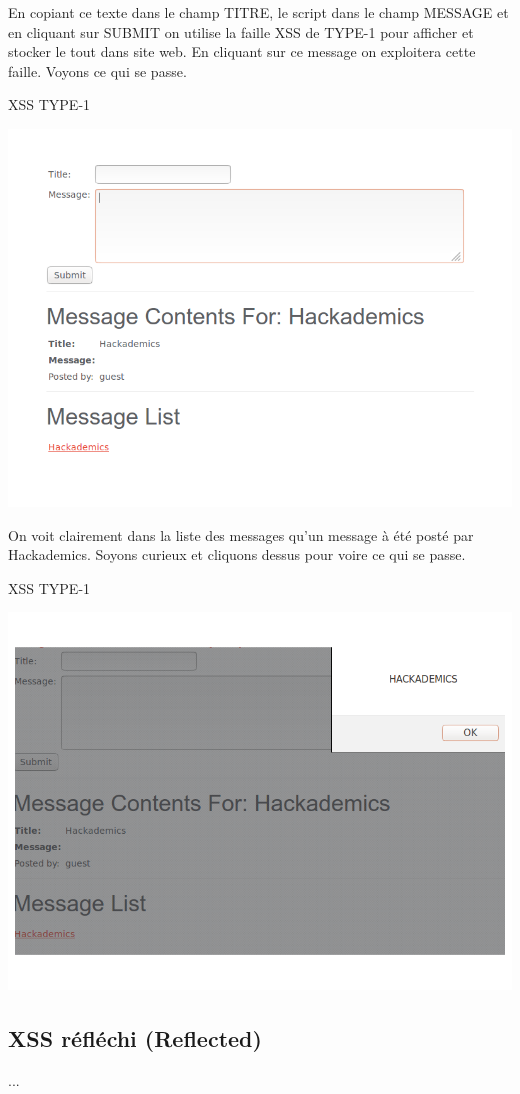 \begin{flushleft}
En copiant ce texte dans le champ TITRE, le script dans le champ MESSAGE et  en cliquant sur SUBMIT on utilise la faille XSS de TYPE-1 pour afficher et stocker le tout dans site web. En cliquant sur ce message on exploitera cette faille. Voyons ce qui se passe.
\end{flushleft}

\begin{center}
\caption{XSS TYPE-1}
\includegraphics[scale=0.3]{Web/assets/xsst1-1.png}
\end{center}

\bigskip

\begin{flushleft}
On voit clairement dans la liste des messages qu'un message à été posté par Hackademics. Soyons curieux et cliquons dessus pour voire ce qui se passe.
\end{flushleft}

\bigskip

\begin{center}
\caption{XSS TYPE-1}
\includegraphics[scale=0.3]{Web/assets/xsst1-2.png}
\end{center}

\subsection{XSS réfléchi (Reflected)}\label{vulnerabilites:web:xss:reflected}

...

\endinput

